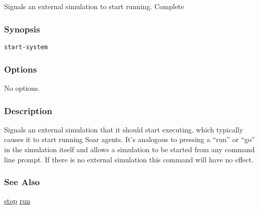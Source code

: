 \subsection{}
\label{start-system}
Signals an external simulation to start running. 
 Complete
\subsubsection*{Synopsis}
\begin{verbatim}
start-system
\end{verbatim}
\subsubsection*{Options}
 No options. 
\subsubsection*{Description}
 Signals an external simulation that it should start executing, which typically causes it to start running Soar agents. It's analogous to pressing a ``run'' or ``go'' in the simulation itself and allows a simulation to be started from any command line prompt. If there is no external simulation this command will have no effect. 
\subsubsection*{See Also}
\hyperref[stop]{stop} \hyperref[run]{run} 